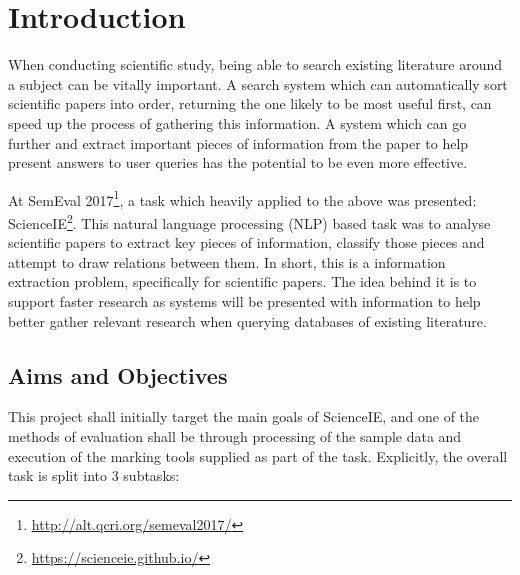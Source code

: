 \chapter{Introduction}

When conducting scientific study, being able to search existing literature around a subject can be vitally important. A search system which can automatically sort scientific papers into order, returning the one likely to be most useful first, can speed up the process of gathering this information. A system which can go further and extract important pieces of information from the paper to help present answers to user queries has the potential to be even more effective.

At SemEval 2017\footnote{\href{http://alt.qcri.org/semeval2017/}{http://alt.qcri.org/semeval2017/}}, a task which heavily applied to the above was presented: ScienceIE\footnote{\href{https://scienceie.github.io/}{https://scienceie.github.io/}}. This natural language processing (NLP) based task was to analyse scientific papers to extract key pieces of information, classify those pieces and attempt to draw relations between them. In short, this is a information extraction problem, specifically for scientific papers. The idea behind it is to support faster research as systems will be presented with information to help better gather relevant research when querying databases of existing literature.

\section{Aims and Objectives}

This project shall initially target the main goals of ScienceIE, and one of the methods of evaluation shall be through processing of the sample data and execution of the marking tools supplied as part of the task. Explicitly, the overall task is split into 3 subtasks:

